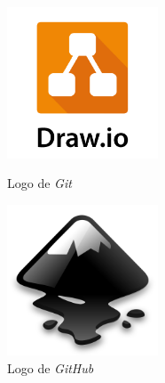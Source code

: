 \begin{figure}[H]
    \centering
    \begin{minipage}{0.38\textwidth}
        \centering
        \includegraphics[width=0.4\textwidth]{Figures/Logo_Draw.png}
        \caption{Logo de \textit{Git}}
    \end{minipage} \hspace{2cm}
    \begin{minipage}{0.38\textwidth}
        \centering
        \includegraphics[width=0.4\textwidth]{Figures/Logo_Inkscape.png}
        \caption{Logo de \textit{GitHub}}
    \end{minipage}
\end{figure}

